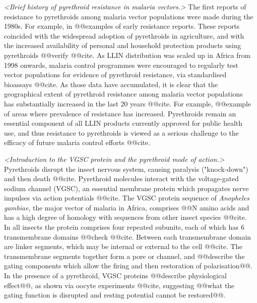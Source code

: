 \documentclass[a4paper,11pt,abstracton,hidelinks]{scrartcl}
\begin{document}
\textit{<Brief history of pyrethroid resistance in malaria vectors.>}
%
The first reports of resistance to pyrethroids among malaria vector populations were made during the 1980s.
%
For example, in @@examples of early resistance reports.
%
These reports coincided with the widespread adoption of pyrethroids in agriculture, and with the increased availability of personal and household protection products using pyrethroids @@verify @@cite.
%
As LLIN distribution was scaled up in Africa from 1998 onwards, malaria control programmes were encouraged to regularly test vector populations for evidence of pyrethroid resistance, via standardised bioassays @@cite.
%
As those data have accumulated, it is clear that the geographical extent of pyrethroid resistance among malaria vector populations has substantially increased in the last 20 years @@cite.
%
For example, @@example of areas where prevalence of resistance has increased.
%
Pyrethroids remain an essential component of all LLIN products currently approved for public health use, and thus resistance to pyrethroids is viewed as a serious challenge to the efficacy of future malaria control efforts @@cite.


\textit{<Introduction to the VGSC protein and the pyrethroid mode of action.>}
%
Pyrethroids disrupt the insect nervous system, causing paralysis ("knock-down") and then death @@cite.
%
Pyrethroid molecules interact with the voltage-gated sodium channel (VGSC), an essential membrane protein which propagates nerve impulses via action potentials @@cite.
%
The VGSC protein sequence of \textit{Anopheles gambiae}, the major vector of malaria in Africa, comprises @@N amino acids and has a high degree of homology with sequences from other insect species @@cite.
%
In all insects the protein comprises four repeated subunits, each of which has 6 transmembrane domains @@check @@cite.
%
Between each transmembrane domain are linker segments, which may be internal or external to the cell @@cite.
%
The transmembrane segments together form a pore or channel, and @@describe the gating components which allow the firing and then restoration of polarisation@@.
%
In the presence of a pyrethroid, VGSC proteins @@describe physiological effect@@, as shown via oocyte experiments @@cite, suggesting @@what the gating function is disrupted and resting potential cannot be restored@@.
\end{document}
